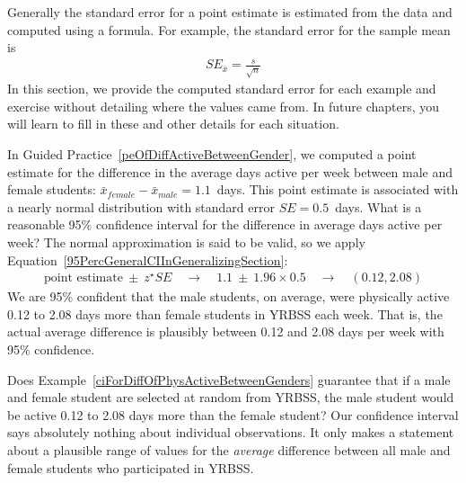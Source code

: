 Generally the standard error for a point estimate is estimated from the data and computed using a formula. For example, the standard error for the sample mean is
\begin{eqnarray*}
SE_{\bar{x}} = \frac{s}{\sqrt{n}}
\end{eqnarray*}
In this section, we provide the computed standard error for each example and exercise without detailing where the values came from. In future chapters, you will learn to fill in these and other details for each situation.

\begin{example}{In Guided Practice~\vref{peOfDiffActiveBetweenGender}, we computed a point estimate for the difference in the average days active per week between male and female students: $\bar{x}_{female}-\bar{x}_{male}=1.1$~days. This point estimate is associated with a nearly normal distribution with standard error $SE = 0.5$~days. What is a reasonable 95\% confidence interval for the difference in average days active per week?}
\label{ciForDiffOfPhysActiveBetweenGenders}
The normal approximation is said to be valid, so we apply Equation~\eqref{95PercGeneralCIInGeneralizingSection}:
\begin{eqnarray*}
\text{point estimate}\ \pm\ z^{\star} SE
  \quad\rightarrow\quad 1.1\ \pm\ 1.96\times 0.5
  \quad\rightarrow\quad (0.12, 2.08)
\end{eqnarray*}
We are 95\% confident that the male students, on average, were physically active 0.12 to 2.08 days more than female students in YRBSS each week. That is, the actual average difference is plausibly between 0.12 and 2.08 days per week with 95\% confidence.
\end{example}


\begin{example}{Does Example~\ref{ciForDiffOfPhysActiveBetweenGenders} guarantee that if a male and female student are selected at random from YRBSS, the male student would be active 0.12 to 2.08 days more than the female student?}
Our confidence interval says absolutely nothing about individual observations. It {only} makes a statement about a plausible range of values for the \emph{average} difference between all male and female students who participated in YRBSS.
\end{example}

